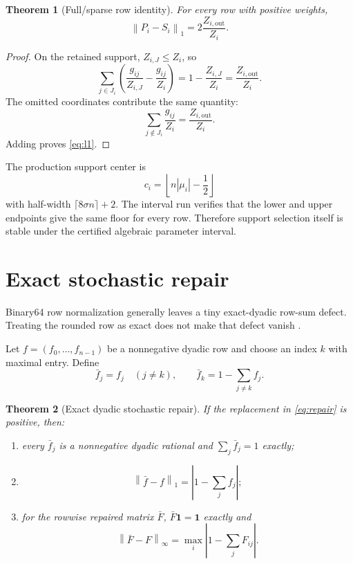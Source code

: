 \documentclass[11pt]{article}
\newtheorem{theorem}{Theorem}[section]
\theoremstyle{definition}
\newcommand{\norm}[1]{\left\lVert#1\right\rVert}
\begin{document}
\begin{theorem}[Full/sparse row identity]
\label{thm:truncation}
For every row with positive weights,
\begin{equation}
 \norm{P_i-S_i}_1
 =2\frac{Z_{i,\mathrm{out}}}{Z_i}.
 \label{eq:l1}
\end{equation}
\end{theorem}

\begin{proof}
On the retained support, $Z_{i,J}\le Z_i$, so
\[
 \sum_{j\in J_i}
 \left(\frac{g_{ij}}{Z_{i,J}}-\frac{g_{ij}}{Z_i}\right)
 =1-\frac{Z_{i,J}}{Z_i}
 =\frac{Z_{i,\mathrm{out}}}{Z_i}.
\]
The omitted coordinates contribute the same quantity:
\[
 \sum_{j\notin J_i}\frac{g_{ij}}{Z_i}
 =\frac{Z_{i,\mathrm{out}}}{Z_i}.
\]
Adding proves \eqref{eq:l1}.
\end{proof}

The production support center is
\[
 c_i=\left\lfloor n|\mu_i|-\frac12\right\rfloor
\]
with half-width $\lceil8\sigma n\rceil+2$.  The interval run verifies that
the lower and upper endpoints give the same floor for every row.  Therefore
support selection itself is stable under the certified algebraic parameter
interval.

\section{Exact stochastic repair}
\label{sec:repair}

Binary64 row normalization generally leaves a tiny exact-dyadic row-sum
defect.  Treating the rounded row as exact does not make that defect vanish
\citep{Higham2002}.

Let $f=(f_0,\ldots,f_{n-1})$ be a nonnegative dyadic row and choose an index
$k$ with maximal entry.  Define
\begin{equation}
 \bar f_j=f_j\quad(j\ne k),
 \qquad
 \bar f_k=1-\sum_{j\ne k}f_j.
 \label{eq:repair}
\end{equation}

\begin{theorem}[Exact dyadic stochastic repair]
\label{thm:repair}
If the replacement in \eqref{eq:repair} is positive, then:
\begin{enumerate}[label=(\roman*),leftmargin=2.2em]
 \item every $\bar f_j$ is a nonnegative dyadic rational and
       $\sum_j\bar f_j=1$ exactly;
 \item
 \begin{equation}
  \norm{\bar f-f}_1
  =\left|1-\sum_jf_j\right|;
  \label{eq:repair-distance}
 \end{equation}
 \item for the rowwise repaired matrix $\bar F$,
       $\bar F\mathbf1=\mathbf1$ exactly and
 \begin{equation}
  \norm{\bar F-F}_\infty
  =\max_i\left|1-\sum_jF_{ij}\right|.
  \label{eq:repair-matrix}
 \end{equation}
\end{enumerate}
\end{theorem}
\end{document}
